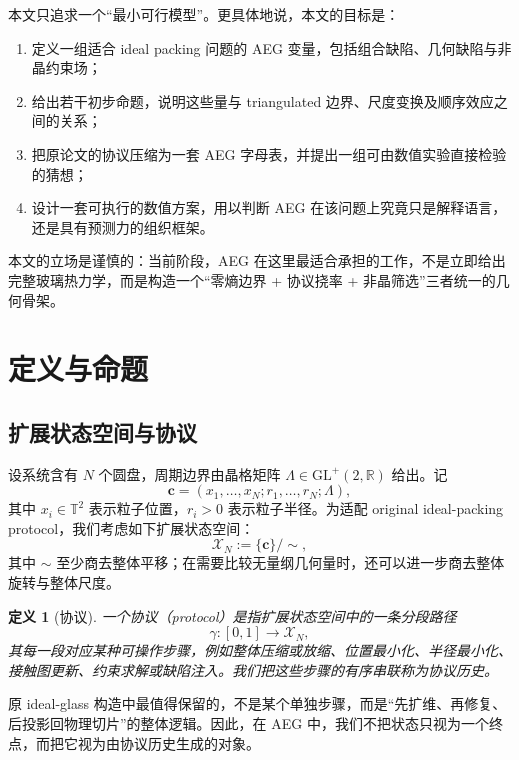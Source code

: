 \documentclass[12pt]{ctexart}
\newtheorem{definition}{定义}[section]
\newcommand{\RR}{\mathbb{R}}
\newcommand{\TT}{\mathbb{T}}
\newcommand{\cX}{\mathcal{X}}
\begin{document}
本文只追求一个“最小可行模型”。更具体地说，本文的目标是：
\begin{enumerate}
    \item 定义一组适合 ideal packing 问题的 AEG 变量，包括组合缺陷、几何缺陷与非晶约束场；
    \item 给出若干初步命题，说明这些量与 triangulated 边界、尺度变换及顺序效应之间的关系；
    \item 把原论文的协议压缩为一套 AEG 字母表，并提出一组可由数值实验直接检验的猜想；
    \item 设计一套可执行的数值方案，用以判断 AEG 在该问题上究竟只是解释语言，还是具有预测力的组织框架。
\end{enumerate}

本文的立场是谨慎的：当前阶段，AEG 在这里最适合承担的工作，不是立即给出完整玻璃热力学，而是构造一个“零熵边界 + 协议挠率 + 非晶筛选”三者统一的几何骨架。

\section{定义与命题}

\subsection{扩展状态空间与协议}

设系统含有 $N$ 个圆盘，周期边界由晶格矩阵 $\Lambda \in \mathrm{GL}^{+}(2,\RR)$ 给出。记
\begin{equation}
\mathbf{c}=(x_1,\dots,x_N;r_1,\dots,r_N;\Lambda),
\end{equation}
其中 $x_i \in \TT^2$ 表示粒子位置，$r_i>0$ 表示粒子半径。为适配 original ideal-packing protocol，我们考虑如下扩展状态空间：
\begin{equation}
\cX_N := \bigl\{\mathbf{c}\bigr\}/\!\sim,
\end{equation}
其中 $\sim$ 至少商去整体平移；在需要比较无量纲几何量时，还可以进一步商去整体旋转与整体尺度。

\begin{definition}[协议]
一个协议（protocol）是指扩展状态空间中的一条分段路径
\begin{equation}
\gamma : [0,1]\to \cX_N,
\end{equation}
其每一段对应某种可操作步骤，例如整体压缩或放缩、位置最小化、半径最小化、接触图更新、约束求解或缺陷注入。我们把这些步骤的有序串联称为协议历史。
\end{definition}

原 ideal-glass 构造中最值得保留的，不是某个单独步骤，而是“先扩维、再修复、后投影回物理切片”的整体逻辑。因此，在 AEG 中，我们不把状态只视为一个终点，而把它视为由协议历史生成的对象。
\end{document}
